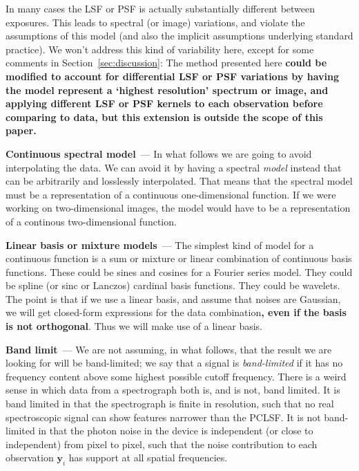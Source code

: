 \documentclass[modern, linenumbers]{aastex631}
\renewcommand{\paragraph}[1]{\medskip\par\noindent\textbf{#1}~---}
\newcommand{\sectionname}{Section}
\newcommand{\secref}[1]{\sectionname~\ref{#1}}
\newcommand{\modified}[1]{\textcolor{Emerald}{\textbf{#1}}}
\begin{document}
In many cases the LSF or PSF is actually substantially different between exposures.
This leads to spectral (or image) variations, and violate the assumptions of this model (and also the implicit assumptions underlying standard practice).
We won't address this kind of variability here, except for some comments in \secref{sec:discussion}:
The method presented here \modified{could be modified to account for differential LSF or PSF variations by having the model represent a `highest resolution' spectrum or image, and applying different LSF or PSF kernels to each observation before comparing to data, but this extension is outside the scope of this paper.}

\paragraph{Continuous spectral model}
In what follows we are going to avoid interpolating the data.
We can avoid it by having a spectral \emph{model} instead that can be arbitrarily and losslessly interpolated.
That means that the spectral model must be a representation of a continuous one-dimensional function.
If we were working on two-dimensional images, the model would have to be a representation of a continous two-dimensional function.

\paragraph{Linear basis or mixture models}
The simplest kind of model for a continuous function is a sum or mixture or linear combination of continuous basis functions.
These could be sines and cosines for a Fourier series model.
They could be spline (or sinc or Lanczos) cardinal basis functions.
They could be wavelets.
The point is that if we use a linear basis, and assume that noises are Gaussian, we will get closed-form expressions for the data combination\modified{, even if the basis is not orthogonal}.
Thus we will make use of a linear basis.

\paragraph{Band limit}
We are not assuming, in what follows, that the result we are looking for will be band-limited;
we say that a signal is \emph{band-limited} if it has no frequency content above some highest possible cutoff frequency.
There is a weird sense in which data from a spectrograph both is, and is not, band limited.
It is band limited in that the spectrograph is finite in resolution, such that no real spectroscopic signal can show features narrower than the PCLSF.
It is not band-limited in that the photon noise in the device is independent (or close to independent) from pixel to pixel, such that the noise contribution to each observation \modified{$\mathbf{y}_i$} has support at all spatial frequencies.
\end{document}
